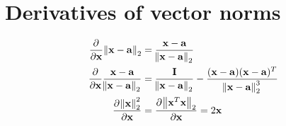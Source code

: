 \section{Derivatives of vector norms}

\begin{align}
\pd{}{\vx}\norm{\vx-\va}_2 &= \frac{\vx-\va}{\norm{\vx-\va}_2} \\
\pd{}{\vx}\frac{\vx-\va}{\norm{\vx-\va}_2} &= \frac{\mI}{\norm{\vx-\va}_2}-\frac{(\vx-\va)(\vx-\va)^T}{\norm{\vx-\va}_2^3} \\
\pd{\norm{\vx}_2^2}{\vx} &= \pd{\norm{\vx^T\vx}_2}{\vx} = 2\vx
\end{align}
